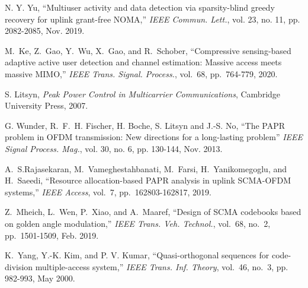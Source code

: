 \documentclass[journal]{IEEEtran}
\numberwithin{const2}{const}
\begin{document}
\begin{thebibliography}{1}
		
	N. Y. Yu,
	``Multiuser activity and data detection via sparsity-blind greedy recovery for uplink grant-free NOMA,''
	\emph{IEEE Commun. Lett.}, vol. 23, no. 11, pp. 2082-2085, Nov. 2019.
	









	M.~Ke, Z.~Gao, Y.~Wu, X.~Gao, and R.~Schober, 
	``Compressive sensing-based adaptive active user detection and channel estimation: Massive access meets massive MIMO,''
	\emph{IEEE Trans. Signal. Process.}, vol.~68, pp.~764-779, 2020.



	
	S. Litsyn, 
	\emph{Peak Power Control in Multicarrier Communications},
	Cambridge University Press, 2007.
	
	
	G. Wunder, R.~F.~H. Fischer, H. Boche, S. Litsyn and J.-S. No, 
	``The PAPR problem in OFDM transmission: New directions for a long-lasting problem''
	\emph{IEEE Signal Process. Mag.}, vol. 30, no. 6, pp. 130-144, Nov. 2013.
	
	A.~S.Rajasekaran, M.~Vameghestahbanati, M.~Farsi, H.~Yanikomegoglu, and H.~Saeedi,
	``Resource allocation-based PAPR analysis in uplink SCMA-OFDM systems,''
	\emph{IEEE Access}, vol.~7, pp.~162803-162817, 2019.
	
	Z.~Mheich, L.~Wen, P.~Xiao, and A.~Maaref,
	``Design of SCMA codebooks based on golden angle modulation,''
	\emph{IEEE Trans. Veh. Technol.}, vol.~68, no.~2, pp.~1501-1509, Feb. 2019.		
	
	K.~Yang, Y.-K. Kim, and P. V. Kumar,
	``Quasi-orthogonal sequences for code-division multiple-access system,''
	\emph{IEEE Trans. Inf. Theory}, vol.~46, no.~3, pp. 982-993, May 2000.


	
	


\end{thebibliography}
\end{document}
